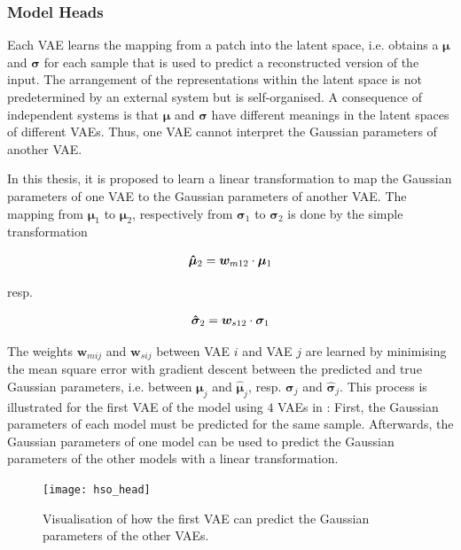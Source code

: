 \subsubsection{Model Heads}
Each VAE learns the mapping from a patch into the latent space, i.e. obtains a $\boldsymbol{\mu}$ and $\boldsymbol{\sigma}$ for each sample that is used to predict a reconstructed version of the input.
The arrangement of the representations within the latent space is not predetermined by an external system but is self-organised. A consequence of independent systems is that $\boldsymbol{\mu}$ and $\boldsymbol{\sigma}$ have different meanings in the latent spaces of different VAEs. Thus, one VAE cannot interpret the Gaussian parameters of another VAE.

In this thesis, it is proposed to learn a linear transformation to map the Gaussian parameters of one VAE to the Gaussian parameters of another VAE. The mapping from $\boldsymbol{\mu}_1$ to $\boldsymbol{\mu}_2$, respectively from $\boldsymbol{\sigma}_1$ to $\boldsymbol{\sigma}_2$ is done by the simple transformation

\begin{align}\eqlbl{hso_7}
	\boldsymbol{\hat{\mu}}_2 = \boldsymbol{w}_{m12} \cdot \boldsymbol{\mu}_1
\end{align}

resp.

\begin{align}\eqlbl{hso_8}
	\boldsymbol{\hat{\sigma}}_2 = \boldsymbol{w}_{s12} \cdot \boldsymbol{\sigma}_1
\end{align}

The weights $\boldsymbol{w}_{mij}$ and $\boldsymbol{w}_{sij}$ between VAE $i$ and VAE $j$ are learned by minimising the mean square error with gradient descent between the predicted and true Gaussian parameters, i.e. between $\boldsymbol{\mu}_j$ and $\boldsymbol{\hat{\mu}}_j$, resp. $\boldsymbol{\sigma}_j$ and $\boldsymbol{\hat{\sigma}}_j$. This process is illustrated for the first VAE of the model using $4$ VAEs in : First, the Gaussian parameters of each model must be predicted for the same sample. Afterwards, the Gaussian parameters of one model can be used to predict the Gaussian parameters of the other models with a linear transformation.

\begin{figure}[h]
    \centering
    \texttt{[image: hso\_head]}
    \caption[Prediction of Gaussian parameters of other VAEs]{Visualisation of how the first VAE can predict the Gaussian parameters of the other VAEs.}
\end{figure}

